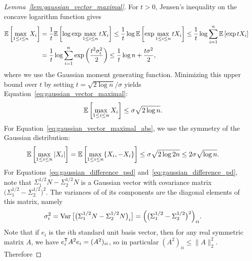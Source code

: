 \begin{proof}[Lemma~\ref{lem:gaussian_vector_maximal}]

  For $t > 0$,
  Jensen's inequality on the concave logarithm function
  gives
  \begin{align*}
    \mathbb{E}\left[
      \max_{1 \leq i \leq n}
      X_i
    \right]
    &=
    \frac{1}{t}
    \mathbb{E}\left[
      \log
      \exp
      \max_{1 \leq i \leq n}
      t X_i
    \right]
    \leq
    \frac{1}{t}
    \log
    \mathbb{E}\left[
      \exp
      \max_{1 \leq i \leq n}
      t X_i
    \right]
    \leq
    \frac{1}{t}
    \log
    \sum_{i=1}^n
    \mathbb{E}\left[
      \exp
      t X_i
    \right] \\
    &=
    \frac{1}{t}
    \log
    \sum_{i=1}^n
    \exp
    \left(
      \frac{t^2 \sigma_i^2}{2}
    \right)
    \leq
    \frac{1}{t}
    \log n
    + \frac{t \sigma^2}{2},
  \end{align*}
  where we use the Gaussian moment generating function.
  Minimizing this upper bound over $t$
  by setting $t = \sqrt{2 \log n} / \sigma$
  yields Equation~\ref{eq:gaussian_vector_maximal}:
  \begin{align*}
    \mathbb{E}\left[
      \max_{1 \leq i \leq n}
      X_i
    \right]
    &\leq
    \sigma \sqrt{2 \log n}.
  \end{align*}
  For Equation~\ref{eq:gaussian_vector_maximal_abs},
  we use the symmetry of the Gaussian distribution:
  \begin{align*}
    \mathbb{E}\left[
      \max_{1 \leq i \leq n}
      |X_i|
    \right]
    &=
    \mathbb{E}\left[
      \max_{1 \leq i \leq n}
      \{X_i, -X_i\}
    \right]
    \leq
    \sigma \sqrt{2 \log 2n}
    \leq
    2 \sigma \sqrt{\log n}.
  \end{align*}
  For
  Equations~\ref{eq:gaussian_difference_psd}
  and~\ref{eq:gaussian_difference_pd},
  note that
  $\Sigma_1^{1/2} N - \Sigma_2^{1/2} N$
  is a Gaussian vector with covariance matrix
  $\big(\Sigma_1^{1/2} - \Sigma_2^{1/2}\big)^2$.
  The variances of of its components are the diagonal
  elements of this matrix, namely
  \begin{align*}
    \sigma_i^2
    &=
    \operatorname{Var}\big[
      \big(\Sigma_1^{1/2} N - \Sigma_2^{1/2} N\big)_i
    \big]
    =
    \Big(\big(
        \Sigma_1^{1/2} - \Sigma_2^{1/2}
    \big)^2\Big)_{ii}.
  \end{align*}
  Note that if $e_i$ is the
  $i$th standard unit basis vector,
  then for any real symmetric matrix $A$,
  we have
  $e_i^{\mathsf{T}} A^2 e_i = (A^2)_{ii}$,
  so in particular
  $(A^2)_{ii} \leq \|A\|_2^2$.
  Therefore

\end{proof}
